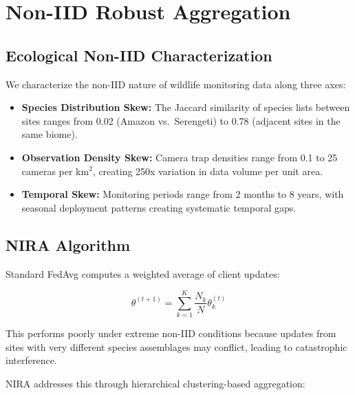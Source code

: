 \section{Non-IID Robust Aggregation}

\label{sec:aggregation}

\subsection{Ecological Non-IID Characterization}

We characterize the non-IID nature of wildlife monitoring data along three axes:

\begin{itemize}[leftmargin=*]
    \item \textbf{Species Distribution Skew:} The Jaccard similarity of species lists between sites ranges from 0.02 (Amazon vs.\ Serengeti) to 0.78 (adjacent sites in the same biome).
    \item \textbf{Observation Density Skew:} Camera trap densities range from 0.1 to 25 cameras per km$^2$, creating 250x variation in data volume per unit area.
    \item \textbf{Temporal Skew:} Monitoring periods range from 2 months to 8 years, with seasonal deployment patterns creating systematic temporal gaps.
\end{itemize}

\subsection{NIRA Algorithm}

Standard FedAvg computes a weighted average of client updates:

\begin{equation}
    \theta^{(t+1)} = \sum_{k=1}^{K} \frac{N_k}{N} \theta_k^{(t)}
\end{equation}

This performs poorly under extreme non-IID conditions because updates from sites with very different species assemblages may conflict, leading to catastrophic interference.

NIRA addresses this through hierarchical clustering-based aggregation:

